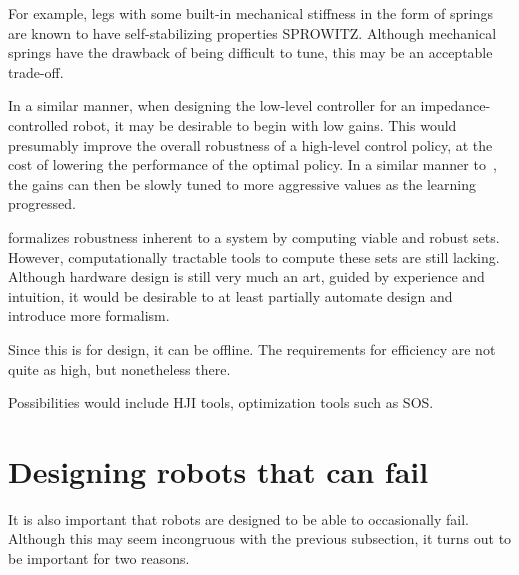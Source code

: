 For example, legs with some built-in mechanical stiffness in the form of springs are known to have self-stabilizing properties SPROWITZ. Although mechanical springs have the drawback of being difficult to tune, this may be an acceptable trade-off. \par

In a similar manner, when designing the low-level controller for an impedance-controlled robot, it may be desirable to begin with low gains. This would presumably improve the overall robustness of a high-level control policy, at the cost of lowering the performance of the optimal policy. In a similar manner to~\textcite{heim2018shaping}, the gains can then be slowly tuned to more aggressive values as the learning progressed. \par

\textcite{heim2019beyond} formalizes robustness inherent to a system by computing viable and robust sets. However, computationally tractable tools to compute these sets are still lacking. Although hardware design is still very much an art, guided by experience and intuition, it would be desirable to at least partially automate design and introduce more formalism. 
\par
Since this is for design, it can be offline. The requirements for efficiency are not quite as high, but nonetheless there.
\par
Possibilities would include HJI tools, optimization tools such as SOS.

\section{Designing robots that can fail}
It is also important that robots are designed to be able to occasionally fail. Although this may seem incongruous with the previous subsection, it turns out to be important for two reasons. \par

